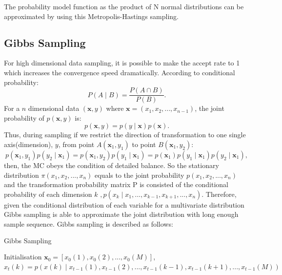 	The probability model function as the product of N normal distributions can be approximated by using this Metropolis-Hastings sampling.
\subsection{Gibbs Sampling}
	\label{sec:Gibbs}
	For high dimensional data sampling, it is possible to make the accept rate to 1 which increases the convergence speed dramatically.
	According to conditional probability:
	\begin{equation}
		P(A \mid B) = \frac{P(A \cap B)}{P(B)}.
	\end{equation}
	For a $ n $ dimensional data $ (\mathbf{x}, y) $ where $ \mathbf{x}=(x_1,x_2,...,x_{n-1}) $, the joint probability of $p(\mathbf{x},y)$ is:
	\begin{equation}
		p(\mathbf{x},y) = p(y \mid \mathbf{x})p(\mathbf{x}).
	\end{equation}
	Thus, during sampling if we restrict the direction of transformation to one single axis(dimension), $ y $, from point $ A(\mathbf{x}_1, y_1) $ to point $ B(\mathbf{x}_1, y_2)$:
	\begin{equation}
		p(\mathbf{x}_1, y_1)p(y_2 \mid \mathbf{x}_1) = p(\mathbf{x}_1, y_2)p(y_1 \mid \mathbf{x}_1) = p(\mathbf{x}_1)p(y_1 \mid \mathbf{x}_1)p(y_2 \mid \mathbf{x}_1),
	\end{equation}
	then, the MC obeys the condition of detailed balance.
	So the stationary distribution $ \pi(x_1,x_2,...,x_n) $ equals to the joint probability $ p(x_1,x_2,...,x_n) $ and the transformation probability matrix P is consisted of the conditional probability of each dimension $ k $ $,  p(x_k \mid x_1,...,x_{k-1},x_{k+1},...,x_n) $.
	Therefore, given the conditional distribution of each variable for a multivariate distribution Gibbs sampling is able to approximate the joint distribution with long enough sample sequence.
	Gibbs sampling is described as follows:
	\begin{algorithm}[h]
	  \caption{Gibbs Sampling}
	  \label{alg:gibbs}
	  \begin{algorithmic}
	  	
	    \State Initialisation $\mathbf{x}_0 = [x_0(1),x_0(2),...,x_0(M)]$,  
	    		\State $ x_t(k) = p(x(k) \mid x_{t-1}(1),x_{t-1}(2),...,x_{t-1}(k-1),x_{t-1}(k+1),...,x_{t-1}(M))$\\
			\EndFor
		\EndFor
	  \end{algorithmic}
	\end{algorithm}
	

